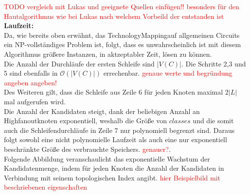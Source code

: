 \documentclass[11pt, a4paper, german]{article}
\newcommand{\TM}{TechnologyMapping}
\begin{document}
 
 \textcolor{red}{ TODO vergleich mit Lukas und geeignete Quellen einfügen!! besonders für den Hautalgorithmus wie bei Lukas nach welchem Vorbeild der entstanden ist}\\
 
 {\bf Laufzeit:} \\
Da, wie bereits oben erwähnt, das \TM auf allgemeinen Circuits ein NP-vollständiges Problem ist, folgt, dass es unwahrscheinlich ist mit diesem Algorithmus größere Instanzen, in aktzeptabler Zeit, lösen zu können. \\
Die Anzahl der Durchläufe der ersten Schleife sind $|V(C)|$. Die Schritte 2,3 und 5 sind ebenfalls in $\mathcal{O}(|V(C)|)$ errechenbar. \textcolor{red}{genaue werte und begründung angeben angeben!} \\ 
Des Weiteren gilt, dass die Schleife aus Zeile 6 für jeden Knoten maximal $2|L|$ mal aufgerufen wird. \\
Die Anzahl der Kandidaten steigt, dank der beliebigen Anzahl an Highfanoutknoten exponentiell, weshalb die Größe von $classes$ und die somit auch die Schleifendurchläufe in Zeile 7 nur polynomiell begrenzt sind. Daraus folgt sowohl eine nicht polynomielle Laufzeit als auch eine nur exponentiell beschränkte Größe des verbrauchte Speichers. \textcolor{red}{genauer?}.\\

Folgende Abbildung veranschaulicht das exponentielle Wachstum der Kandidatenmenge, indem für jeden Knoten die Anzahl der Kandidaten in Verbindung mit seinem topologischen Index angibt. \textcolor{red}{hier Beispielbild mit beschriebenen eigenschaften} \\
\end{document}
